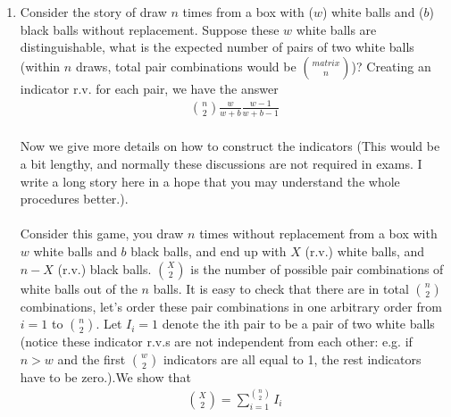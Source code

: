 
\setcounter{theorem}{47}
\begin{exercise} [BH.4.48]
\begin{solution}\begin{enumerate}
    \item Consider the story of draw $n$ times from a box with ($w$) white  balls and ($b$) black balls without replacement. Suppose these $w$ white balls are distinguishable, what is the expected number of pairs of two white balls (within $n$ draws, total pair combinations would be $\binom{matrix}{n}$)? Creating an indicator r.v. for each pair, we have the answer 
    \begin{align*}
        \binom{n}{2}\frac{w}{w+b}\frac{w-1}{w+b-1}
    \end{align*}
    ~\\ Now we give more details on how to construct the indicators (This would be a bit lengthy, and normally these discussions are not required in exams. I write a long story here in a hope that you may understand the whole procedures better.). \\~\\
    Consider this game, you draw $n$ times without replacement from a box with $w$ white balls and $b$ black balls, and end up with $X$ (r.v.) white balls, and $n-X$ (r.v.) black balls. $\binom{X}{2}$ is the number of possible pair combinations of white balls out of the $n$ balls. It is easy to check that there are in total $\binom{n}{2}$ combinations, let's order these pair combinations in one arbitrary order from $i=1$ to $\binom{n}{2}$.  Let $I_i=1$ denote the ith pair to be a pair of two white balls (notice these indicator r.v.s are not independent from each other: e.g. if $n>w$ and the first $\binom{w}{2}$ indicators are all equal to 1, the rest indicators have to be zero.).We show that 
    \begin{align}
    \binom{X}{2} = \sum_{i=1}^{\binom{n}{2}} I_i \label{1}
    \end{align}

\end{enumerate}
\end{solution}
\end{exercise}

